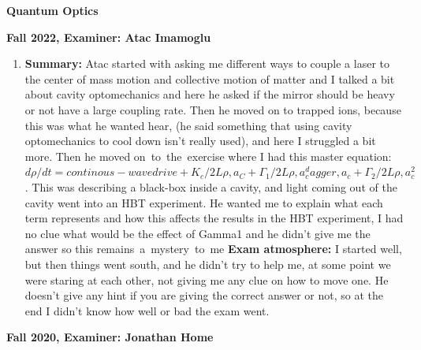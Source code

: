 \documentclass{article}%
\begin{document}
%
\normalsize%
\begin{center}%
\begin{Large}%
\textbf{Quantum Optics}%
\end{Large}%
\linebreak%
\end{center}%
\begin{center}%
\begin{large}%
\textbf{Fall 2022, Examiner: Atac Imamoglu}%
\end{large}%
\end{center}%
\begin{enumerate}%
\item%
\begin{mycolorbox}%
\textbf{Summary:}%
\newline%
Atac started with asking me different ways to couple a laser to the center of mass motion and collective motion of matter and I talked a bit about cavity optomechanics and here he asked if the mirror should be heavy or not have a large coupling rate. Then he moved on to trapped ions, because this was what he wanted hear, (he said something that using cavity optomechanics to cool down isn't really used), and here I struggled a bit more. Then he moved on~to~the~exercise where I had this master equation: %
$d\rho/dt = continous-wave drive + K_c/2 L{\rho, a_C}  + \Gamma_1 / 2 L{\rho, a_c^dagger, a_c} + \Gamma_2 /2 L{\rho, a_c^2}$%
. This was describing a black{-}box inside a cavity, and light coming out of the cavity went into an HBT experiment. He wanted me to explain what each term represents and how this affects the results in the HBT experiment, I had no clue what would be the effect of Gamma1 and he didn't give me the answer so this remains~a~mystery~to~me%
\newline%
\newline%
\textbf{Exam atmosphere:}%
\newline%
I started well, but then things went south, and he didn't try to help me, at some point we were staring at each other, not giving me any clue on how to move one. He doesn't give any hint if you are giving the correct answer or not, so at the end I didn't know how well or bad the exam went.%
\end{mycolorbox}%
\end{enumerate}%
\newpage%
\begin{center}%
\begin{large}%
\textbf{Fall 2020, Examiner: Jonathan Home}%
\end{large}%
\end{center}%
\end{document}
